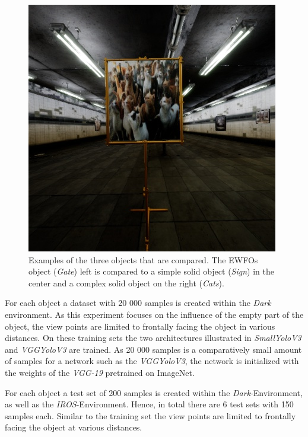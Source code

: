\begin{figure}[hbtp]
\begin{minipage}{0.3\textwidth}
	\end{minipage}
	\begin{minipage}{0.3\textwidth}
		\includegraphics[width=\textwidth]{fig/cats}
	\end{minipage}
	\caption{Examples of the three objects that are compared. The \acp{EWFO} object (\textit{Gate}) left is compared to a simple solid object (\textit{Sign}) in the center and a complex solid object on the right (\textit{Cats}).}
	\label{fig:cats}
\end{figure}

For each object a dataset with 20 000 samples is created within the \textit{Dark} environment. As this experiment focuses on the influence of the empty part of the object, the view points are limited to frontally facing the object in various distances. On these training sets the two architectures illustrated in  \textit{SmallYoloV3} and \textit{VGGYoloV3} are trained. As 20 000 samples is a comparatively small amount of samples for a network such as the \textit{VGGYoloV3}, the network is initialized with the weights of the \textit{VGG-19} pretrained on ImageNet.

For each object a test set of 200 samples is created within the \textit{Dark}-Environment, as well as the \textit{IROS}-Environment. Hence, in total there are 6 test sets with 150 samples each. Similar to the training set the view points are limited to frontally facing the object at various distances.



